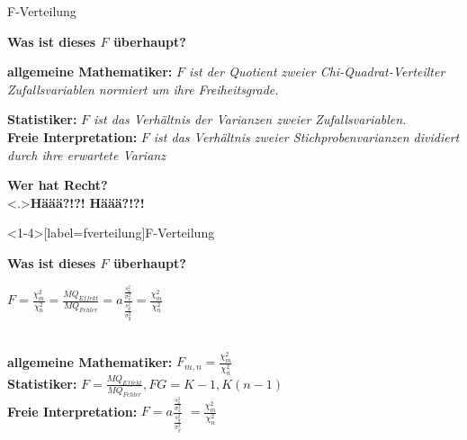 \documentclass{beamer}
\begin{document}
	\begin{frame}{F-Verteilung}
		\begin{center}
			\textbf{Was ist dieses $F$ überhaupt?}
		\end{center}
		\textbf{allgemeine Mathematiker:} \emph{$F$ ist der Quotient zweier Chi-Quadrat-Verteilter Zufallsvariablen normiert um ihre Freiheitsgrade.} \\ \vspace{0.7ex}
		\pause
		
		\textbf{Statistiker:} \emph{$F$ ist das Verhältnis der Varianzen zweier Zufallsvariablen.}\\
		\vspace{0.7ex} \pause
		\textbf{Freie Interpretation:} \emph{$F$ ist das Verhältnis zweier Stichprobenvarianzen dividiert durch ihre erwartete Varianz} \\ \vspace{0.7ex} \pause
		\begin{center}
			\textbf{Wer hat Recht? }
			\\ \vspace{0.7ex} \pause \note<.>{\alert{{\Large \textbf{Häää?!?!}} }}
			\alert{{\Large \textbf{Häää?!?!}} }
		\end{center}
	\end{frame}
	
	\begin{frame}<1-4>[label=fverteilung]{F-Verteilung}
		\begin{center}
			\textbf{Was ist dieses $F$ überhaupt?}
		
		\pause[]$F=\frac{\chi^2_m}{\chi^2_n}$\pause[3] $=\frac{MQ_{Effekt}}{MQ_{Fehler}}$\pause[4] $=a\frac{\frac{s_x^2}{\sigma_x^2}}{\frac{s_y^2}{\sigma_y^2}}$\pause[5]  $=\frac{\chi^2_m}{\chi^2_n}$ 
		\end{center}
		\pause[2]~\\ \vspace{1.2ex}
		\textbf{allgemeine Mathematiker:} \emph{$F_{m,n}=\frac{\chi^2_m}{\chi^2_n}$}   
		 \pause[3] ~\\ \vspace{1.2ex}
		\textbf{Statistiker:} $F = \frac{MQ_{Effekt}}{MQ_{Fehler}}, FG=K-1,K(n-1)$ \pause[4] ~\\  \vspace{1.2ex} 
		\textbf{Freie Interpretation:} $F = a  \frac{\frac{s_x^2}{\sigma_x^2}}{\frac{s_y^2}{\sigma_y^2}}$ \pause[5]  $=\frac{\chi^2_m}{\chi^2_n}$ ~\\
		
	\end{frame}
	
\end{document}
